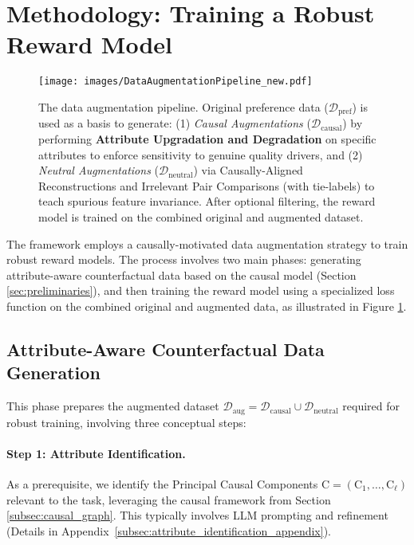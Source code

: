 \section{Methodology: Training a Robust Reward Model}
\label{sec:methodology}

\begin{figure}[t!]
\centering
\texttt{[image: images/DataAugmentationPipeline\_new.pdf]} %
\caption{The \carma{} data augmentation pipeline. Original preference data ($\mathcal{D}_{\mathrm{pref}}$) is used as a basis to generate: (1) \textit{Causal Augmentations} ($\mathcal{D}_{\mathrm{causal}}$) by performing \textbf{Attribute Upgradation and Degradation} on specific attributes to enforce sensitivity to genuine quality drivers, and (2) \textit{Neutral Augmentations} ($\mathcal{D}_{\mathrm{neutral}}$) via Causally-Aligned Reconstructions and Irrelevant Pair Comparisons (with tie-labels) to teach spurious feature invariance. After optional filtering, the reward model is trained on the combined original and augmented dataset.}
\label{fig:data_augmentation_pipeline}
\end{figure}

The \carma{} framework employs a causally-motivated data augmentation strategy to train robust reward models. The process involves two main phases: generating attribute-aware counterfactual data based on the causal model (Section \ref{sec:preliminaries}), and then training the reward model using a specialized loss function on the combined original and augmented data, as illustrated in Figure \ref{fig:data_augmentation_pipeline}.

\subsection{Attribute-Aware Counterfactual Data Generation}
\label{subsec:data_generation_phase}

This phase prepares the augmented dataset $\mathcal{D}_{\mathrm{aug}} = \mathcal{D}_{\mathrm{causal}} \cup \mathcal{D}_{\mathrm{neutral}}$ required for robust training, involving three conceptual steps:

\paragraph{Step 1: Attribute Identification.}
As a prerequisite, we identify the Principal Causal Components $\mathrm{C} = (\mathrm{C}_1, \dots, \mathrm{C}_\ell)$ relevant to the task, leveraging the causal framework from Section \ref{subsec:causal_graph}. This typically involves LLM prompting and refinement (Details in Appendix~\ref{subsec:attribute_identification_appendix}).

